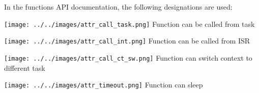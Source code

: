 In the functions A\+P\+I documentation, the following designations are used\+:


\begin{DoxyItemize}
\item   \texttt{[image: ../../images/attr\_call\_task.png]}  Function can be called from task
\item   \texttt{[image: ../../images/attr\_call\_int.png]}  Function can be called from I\+S\+R
\item   \texttt{[image: ../../images/attr\_call\_ct\_sw.png]}  Function can switch context to different task
\item   \texttt{[image: ../../images/attr\_timeout.png]}  Function can sleep 
\end{DoxyItemize}